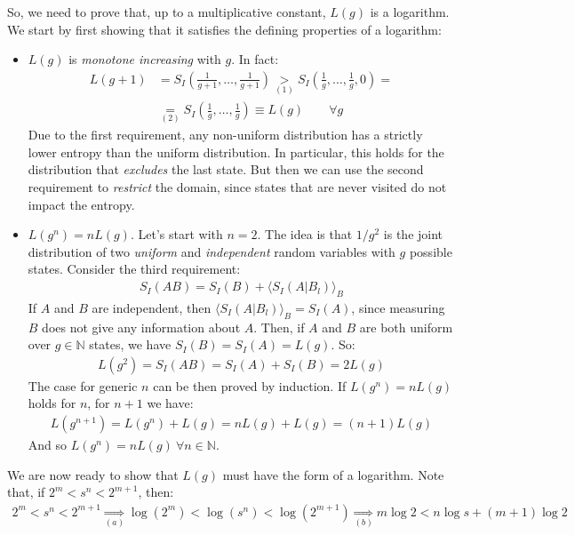 \documentclass[../../main.tex]{subfiles}
\begin{document}
\medskip

So, we need to prove that, up to a multiplicative constant, $L(g)$ is a logarithm. We start by first showing that it satisfies the defining properties of a logarithm:

\begin{itemize}
    \item $L(g)$ is \textit{monotone increasing} with $g$. In fact:
    \begin{align*}
        L(g+1) &= S_{I} \left(\frac{1}{g+1},\dots, \frac{1}{g+1}  \right) \underset{(1)}{>} S_I\left(\frac{1}{g}, \dots, \frac{1}{g}, 0\right) =\\
        &\underset{(2)}{=} S_I\left(\frac{1}{g},\dots,\frac{1}{g} \right) \equiv L(g) \qquad \forall g
    \end{align*}
    Due to the first requirement, any non-uniform distribution has a strictly lower entropy than the uniform distribution. In particular, this holds for the distribution that \textit{excludes} the last state. But then we can use the second requirement to \textit{restrict} the domain, since states that are never visited do not impact the entropy.
    \item $L(g^n) = n L(g)$. Let's start with $n=2$. The idea is that $1/g^2$ is the joint distribution of two \textit{uniform} and \textit{independent} random variables with $g$ possible states. Consider the third requirement:
    \begin{align*}
        S_I(AB) = S_I(B) + \langle S_I(A|B_l) \rangle_B
    \end{align*}
    If $A$ and $B$ are independent, then $\langle S_I(A|B_l) \rangle_B = S_I(A)$, since measuring $B$ does not give any information about $A$. Then, if $A$ and $B$ are both uniform over $g \in \mathbb{N}$ states, we have $S_I(B) = S_I(A) = L(g)$. So:
    \begin{align*}
        L(g^2) = S_I(AB) = S_I(A) + S_I(B) = 2 L(g)
    \end{align*}
    The case for generic $n$ can be then proved by induction. If $L(g^n) = n L(g)$ holds for $n$, for $n+1$ we have:
    \begin{align*}
        L(g^{n+1}) = L(g^n) + L(g) = n L(g) + L(g) = (n+1) L(g)
    \end{align*}
    And so $L(g^n) = nL(g) \> \forall n \in \mathbb{N}$.
\end{itemize}
We are now ready to show that $L(g)$ must have the form of a logarithm. Note that, if $2^m < s^n < 2^{m+1}$, then:
\begin{align*}
    2^m < s^n < 2^{m+1} \underset{(a)}{\Rightarrow}  \log (2^m) < \log(s^n) < \log(2^{m+1}) \underset{(b)}{\Rightarrow}  m \log 2 < n \log s + (m+1)\log 2
\end{align*}
\end{document}

